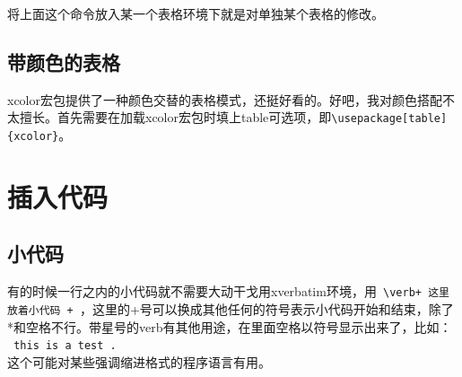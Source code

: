 \documentclass[12pt,oneside]{book}
\begin{document}
\begin{common-format}
将上面这个命令放入某一个表格环境下就是对单独某个表格的修改。

\subsection[带颜色的表格]{带颜色的表格}
\label{sec:带颜色的表格}
xcolor宏包提供了一种颜色交替的表格模式，还挺好看的。好吧，我对颜色搭配不太擅长。首先需要在加载xcolor宏包时填上table可选项，即\verb+\usepackage[table]{xcolor}+。

\begin{table}[H]
\centering
{}
\caption{带颜色的表格}
\label{tab:带颜色的表格}
\end{table}




\section{插入代码}
\subsection{小代码}
有的时候一行之内的小代码就不需要大动干戈用xverbatim环境，用\verb| \verb+ 这里放着小代码 + |，这里的+号可以换成其他任何的符号表示小代码开始和结束，除了*和空格不行。带星号的verb有其他用途，在里面空格以符号显示出来了，比如：\\
\verb*| this is a test . | \\这个可能对某些强调缩进格式的程序语言有用。


\end{common-format}
\end{document}
